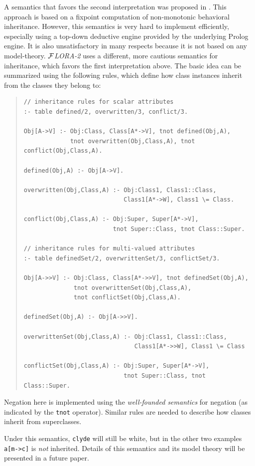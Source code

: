 \documentclass[11pt]{article}
\newcommand{\FLORA}{{\mbox{${\cal F}${\small\it LORA}\rm\emph{-2}}}\xspace}
\begin{document}
A semantics that favors the second interpretation was proposed in
\cite{KLW95}. This approach is based on a fixpoint computation of
non-monotonic behavioral inheritance.  However, this semantics is very hard
to implement efficiently, especially using a top-down deductive engine
provided by the underlying Prolog engine. It is also unsatisfactory in many
respects because it is not based on any model-theory. \FLORA uses a
different, more cautious semantics for inheritance, which favors the first
interpretation above.  The basic idea can be summarized using the following
rules, which define how class instances inherit from the classes they
belong to:
\begin{quote}
\begin{verbatim}
// inheritance rules for scalar attributes
:- table defined/2, overwritten/3, conflict/3.

Obj[A->V] :- Obj:Class, Class[A*->V], tnot defined(Obj,A),
             tnot overwritten(Obj,Class,A), tnot conflict(Obj,Class,A).

defined(Obj,A) :- Obj[A->V].

overwritten(Obj,Class,A) :- Obj:Class1, Class1::Class,
                            Class1[A*->W], Class1 \= Class.

conflict(Obj,Class,A) :- Obj:Super, Super[A*->V],
                         tnot Super::Class, tnot Class::Super.

// inheritance rules for multi-valued attributes
:- table definedSet/2, overwrittenSet/3, conflictSet/3.

Obj[A->>V] :- Obj:Class, Class[A*->>V], tnot definedSet(Obj,A),
              tnot overwrittenSet(Obj,Class,A),
              tnot conflictSet(Obj,Class,A).

definedSet(Obj,A) :- Obj[A->>V].

overwrittenSet(Obj,Class,A) :- Obj:Class1, Class1::Class,
                               Class1[A*->>W], Class1 \= Class

conflictSet(Obj,Class,A) :- Obj:Super, Super[A*->V],
                            tnot Super::Class, tnot Class::Super.
\end{verbatim}
\end{quote}
Negation here is implemented using the {\em well-founded semantics}
for negation \cite{gelder-alternating-89,gelder-ross-schlipf-91} (as
indicated by the {\tt tnot} operator).  Similar rules are needed to
describe how classes inherit from superclasses.

Under this semantics, {\tt clyde} will still be white, but in the other two
examples {\tt a[m->c]} is \emph{not} inherited. Details of this semantics
and its model theory will be presented in a future paper.
\end{document}
